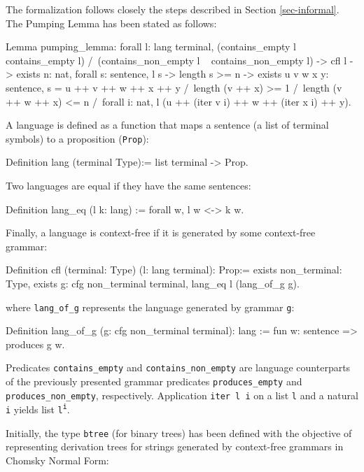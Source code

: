 \documentclass {elsarticle}
\begin{document}
The formalization follows closely the steps described in Section \ref {sec-informal}. The Pumping Lemma has been stated as follows:

\begin{coq}
Lemma pumping_lemma:
forall l: lang terminal,
(contains_empty l \/ ~ contains_empty l) /\ 
(contains_non_empty l \/ ~ contains_non_empty l) ->
cfl l ->
exists n: nat, 
forall s: sentence, 
l s -> 
length s >= n ->
exists u v w x y: sentence, 
s = u ++ v ++ w ++ x ++ y /\
length (v ++ x) >= 1 /\
length (v ++ w ++ x) <= n /\
forall i: nat, l (u ++ (iter v i) ++ w ++ (iter x i) ++ y).
\end{coq}

A language is defined as a function that maps a sentence (a list of terminal symbols) to a proposition (\texttt {Prop}):

\begin{coq}
Definition lang (terminal Type):= list terminal -> Prop.
\end{coq}

Two languages are equal if they have the same sentences:

\begin{coq}
Definition lang_eq (l k: lang) := 
forall w, l w <-> k w.
\end{coq}

Finally, a language is context-free if it is generated by some context-free grammar:

\begin{coq}
Definition cfl (terminal: Type) (l: lang terminal): Prop:=
exists non_terminal: Type, 
exists g: cfg non_terminal terminal, 
lang_eq l (lang_of_g g).
\end{coq}

\noindent
where \texttt {lang\_of\_g} represents the language generated by grammar \texttt {g}:

\begin{coq}
Definition lang_of_g (g: cfg non_terminal terminal): lang :=
fun w: sentence => produces g w.
\end{coq}

Predicates \texttt {contains\_empty} and \texttt {contains\_non\_empty} are language counterparts of the previously presented grammar predicates \texttt {produces\_empty} and \texttt {produces\_non\_empty}, respectively. Application \texttt {iter l i} on a list \texttt {l} and a natural \texttt {i} yields list \texttt {l\textsuperscript{i}}.

Initially, the type \texttt {btree} (for binary trees) has been defined with the objective of representing derivation trees for strings generated by context-free grammars in Chomsky Normal Form:
\end{document}
